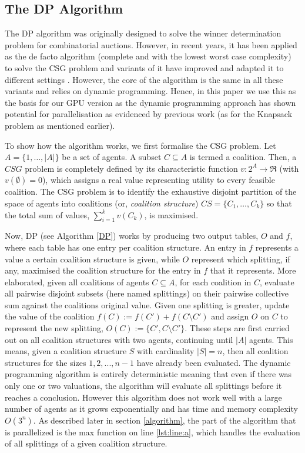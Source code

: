 \documentclass{llncs}
\begin{document}
\subsection{The {DP} Algorithm} 
The DP algorithm \cite{DPalgorithm} was originally designed to solve the winner determination problem for combinatorial auctions. However, in recent years, it has been applied as the de facto  algorithm (complete and with the lowest worst case complexity) to solve the CSG problem and variants of it have improved and adapted it to different settings \cite{DBLP:conf/atal/RahwanJ08,DBLP:conf/aamas/VoiceRJ12}. However, the core of the algorithm is the same in all these variants and relies on dynamic programming. Hence, in this paper we use this as the basis for our GPU version as the dynamic programming approach has shown potential for parallelisation as evidenced by previous work (as for the Knapsack problem as mentioned earlier). 

To show how the algorithm works, we first formalise the CSG problem.  Let $A=\{1,\ldots,\vert A \vert \}$ be a set of agents. A subset $C \subseteq A$ is termed a coalition.  Then, a $CSG$ problem is completely defined by its characteristic function $v: 2^{A} \rightarrow \Re$ (with $v(\emptyset)=0$), which assigns a real value representing utility to every feasible coalition.  The CSG problem is to identify the exhaustive disjoint partition of the space of agents into coalitions (or, \emph{coalition structure})  $CS=\{C_1,\ldots,C_k\}$ so that the total sum of values, $\sum^k_{i=1} v(C_k)$,
is maximised.

Now, DP (see Algorithm  \ref{DP}) works by producing two output tables, $O$ and $f$, 
where each table has one entry per coalition structure. 
An entry in $f$ represents a value a certain coalition structure is given, 
while $O$ represent which splitting, if any, maximised the coalition structure for the entry in $f$ that it represents.
More elaborated, given all coalitions of agents $C\subseteq A$, for each coalition in $C$, evaluate all
pairwise disjoint subsets (here named splittings) on their pairwise collective sum against the coalitions
original value. Given one splitting is greater, update the value of the coalition $f(C) := f(C') + f(C\setminus C')$
and assign $O$ on $C$ to represent the new splitting, $O(C) := \{C',C\setminus C'\}$. These steps are first carried out on all coalition structures with two agents, continuing until $|A|$ agents.  This means, given a coalition structure $S$ with cardinality $|S| = n$, then all coalition structures
for the sizes $1,2,...,n-1$ have already been evaluated. The dynamic programming algorithm is entirely deterministic meaning that even if there was only one or two valuations, the algorithm will evaluate all splittings before it reaches a conclusion. However this algorithm does not work well with a large number of agents as it grows exponentially and has time and memory complexity $O(3^n)$. As described later in section \ref{algorithm}, the part of the algorithm that is parallelized is the max function on line \ref{lst:line:a}, which handles the evaluation of all splittings of a given coalition structure.
\end{document}
